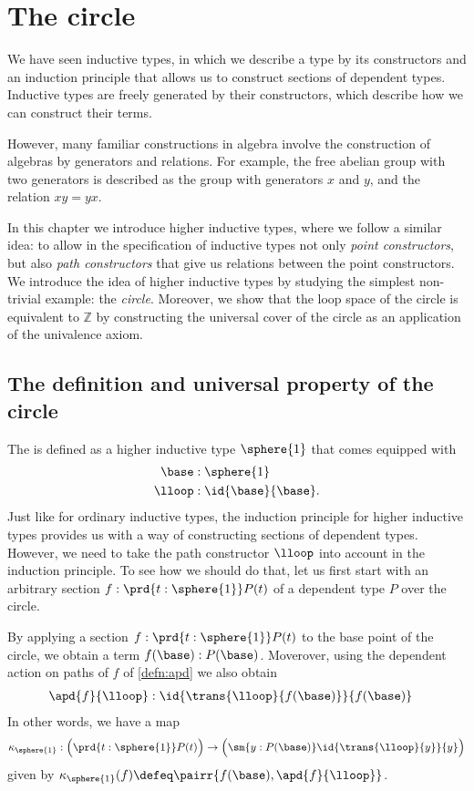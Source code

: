 \chapter{The circle}

We have seen inductive types, in which we describe a type by its constructors and an induction principle that allows us to construct sections of dependent types. Inductive types are freely generated by their constructors, which describe how we can construct their terms. 

However, many familiar constructions in algebra involve the construction of algebras by generators and relations. 
For example, the free abelian group with two generators is described as the group with generators $x$ and $y$, and the relation $xy=yx$. 

In this chapter we introduce higher inductive types, where we follow a similar idea: to allow in the specification of inductive types not only \emph{point constructors}, but also \emph{path constructors} that give us relations between the point constructors. 
We introduce the idea of higher inductive types by studying the simplest non-trivial example: the \emph{circle}.
Moreover, we show that the loop space of the circle is equivalent to $\mathbb{Z}$ by constructing the universal cover of the circle as an application of the univalence axiom. 

\section{The definition and universal property of the circle}
The  is defined as a higher inductive type $\sphere{1}$ that comes equipped with
\begin{align*}
\base & : \sphere{1} \\
\lloop & : \id{\base}{\base}.
\end{align*}
Just like for ordinary inductive types, the induction principle for higher inductive types provides us with a way of constructing sections of dependent types. However, we need to take the path constructor $\lloop$ into account in the induction principle. To see how we should do that, let us first start with an arbitrary section $f:\prd{t:\sphere{1}}P(t)$ of a dependent type $P$ over the circle. 

By applying a section $f:\prd{t:\sphere{1}}P(t)$ to the base point of the circle, we obtain a term $f(\base):P(\base)$. Moverover, using the dependent action on paths of $f$ of \autoref{defn:apd} we also obtain
\begin{align*}
\apd{f}{\lloop} & : \id{\trans{\lloop}{f(\base)}}{f(\base)}
\end{align*}
In other words, we have a map
\begin{equation}\label{eq:kappa_circle}
\kappa_{\sphere{1}}:\Big(\prd{t:\sphere{1}}P(t)\Big)\to\Big(\sm{y:P(\base)}\id{\trans{\lloop}{y}}{y}\Big)
\end{equation}
given by $\kappa_{\sphere{1}}(f)\defeq\pairr{f(\base),\apd{f}{\lloop}}$.

